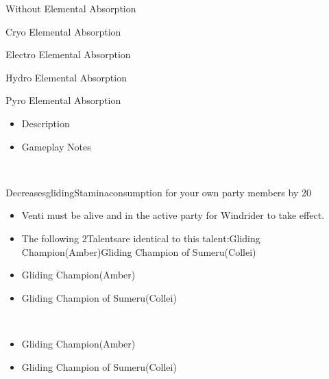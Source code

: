 \documentclass[a4paper,12pt]{article}
\begin{document}
Without Elemental Absorption\\ \par \vspace{0.5cm}

Cryo Elemental Absorption\\ \par \vspace{0.5cm}

Electro Elemental Absorption\\ \par \vspace{0.5cm}

Hydro Elemental Absorption\\ \par \vspace{0.5cm}

Pyro Elemental Absorption\\ \par \vspace{0.5cm}

\begin{itemize}
\item Description
\item Gameplay Notes
\end{itemize}\\ \par \vspace{0.5cm}

DecreasesglidingStaminaconsumption for your own party members by 20%

\begin{itemize}
\item Venti must be alive and in the active party for Windrider to take effect.
\item The following 2Talentsare identical to this talent:Gliding Champion(Amber)Gliding Champion of Sumeru(Collei)
\item Gliding Champion(Amber)
\item Gliding Champion of Sumeru(Collei)
\end{itemize}\\ \par \vspace{0.5cm}

\begin{itemize}
\item Gliding Champion(Amber)
\item Gliding Champion of Sumeru(Collei)
\end{itemize}\\ \par \vspace{0.5cm}
\end{document}

